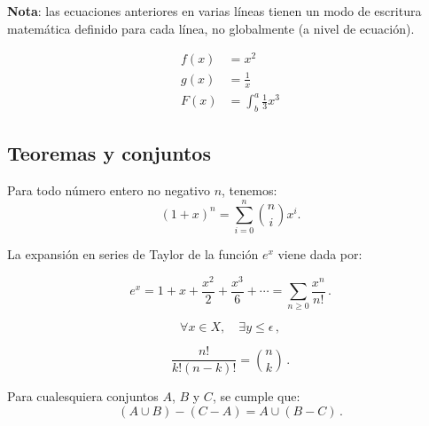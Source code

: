 \textbf{Nota}: las ecuaciones anteriores en varias líneas tienen un modo de escritura matemática definido
para cada línea, no globalmente (a nivel de ecuación).

\begin{align*}
	f(x) &= x^2\\
	g(x) &= \frac{1}{x}\\
	F(x) &= \int^a_b \frac{1}{3}x^3
\end{align*}

\subsection{Teoremas y conjuntos}

\begin{theorem}
	Para todo número entero no negativo $n$, tenemos:
	\[ (1+x)^n = \sum_{i=0}^n {n \choose i} x^i. \]
\end{theorem}

La expansión en series de Taylor de la función $e^x$ viene dada por:

\begin{equation}
	e^x = 1 + x + \frac{x^2}{2} + \frac{x^3}{6} + \cdots = \sum_{n\geq 0} \frac{x^n}{n!}\,.
\end{equation}

\[ \forall x \in X, \quad \exists y \leq \epsilon\,, \]

\[ \frac{n!}{k!(n-k)!} = \binom{n}{k}\,. \]

\begin{theorem}
	Para cualesquiera conjuntos $A$, $B$ y $C$, se cumple que:
	\[ (A\cup B)-(C-A) = A \cup (B-C)\,. \]
\end{theorem} 
